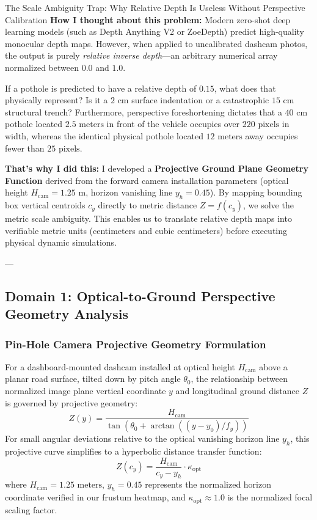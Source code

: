 \begin{designreflection}{The Scale Ambiguity Trap: Why Relative Depth Is Useless Without Perspective Calibration}
\textbf{How I thought about this problem:}
Modern zero-shot deep learning models (such as Depth Anything V2 or ZoeDepth) predict high-quality monocular depth maps. However, when applied to uncalibrated dashcam photos, the output is purely \textit{relative inverse depth}—an arbitrary numerical array normalized between $0.0$ and $1.0$.

If a pothole is predicted to have a relative depth of $0.15$, what does that physically represent? Is it a $2\text{ cm}$ surface indentation or a catastrophic $15\text{ cm}$ structural trench? Furthermore, perspective foreshortening dictates that a $40\text{ cm}$ pothole located $2.5\text{ meters}$ in front of the vehicle occupies over $220\text{ pixels}$ in width, whereas the identical physical pothole located $12\text{ meters}$ away occupies fewer than $25\text{ pixels}$.

\textbf{That's why I did this:}
I developed a \textbf{Projective Ground Plane Geometry Function} derived from the forward camera installation parameters (optical height $H_{\text{cam}} = 1.25\text{ m}$, horizon vanishing line $y_h = 0.45$). By mapping bounding box vertical centroids $c_y$ directly to metric distance $Z = f(c_y)$, we solve the metric scale ambiguity. This enables us to translate relative depth maps into verifiable metric units (centimeters and cubic centimeters) before executing physical dynamic simulations.
\end{designreflection}

---

\subsection{Domain 1: Optical-to-Ground Perspective Geometry Analysis}

\subsubsection{Pin-Hole Camera Projective Geometry Formulation}
For a dashboard-mounted dashcam installed at optical height $H_{\text{cam}}$ above a planar road surface, tilted down by pitch angle $\theta_0$, the relationship between normalized image plane vertical coordinate $y$ and longitudinal ground distance $Z$ is governed by projective geometry:
\begin{equation}
Z(y) = \frac{H_{\text{cam}}}{\tan(\theta_0 + \arctan((y - y_0) / f_y))}
\end{equation}
For small angular deviations relative to the optical vanishing horizon line $y_h$, this projective curve simplifies to a hyperbolic distance transfer function:
\begin{equation}
Z(c_y) = \frac{H_{\text{cam}}}{c_y - y_h} \cdot \kappa_{\text{opt}}
\end{equation}
where $H_{\text{cam}} = 1.25\text{ meters}$, $y_h = 0.45$ represents the normalized horizon coordinate verified in our frustum heatmap, and $\kappa_{\text{opt}} \approx 1.0$ is the normalized focal scaling factor.

